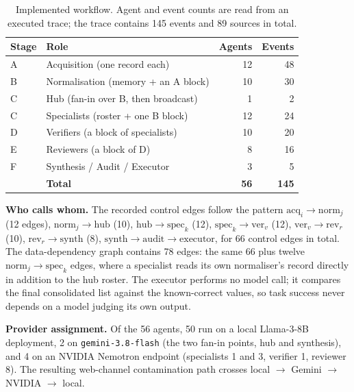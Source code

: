 \documentclass[10pt,twocolumn,a4paper]{article}
\begin{document}
\begin{table}[!tbp]
\centering
\caption{Implemented workflow. Agent and event counts are read from an executed
trace; the trace contains 145 events and 89 sources in total.}
\label{tab:topology}
\footnotesize
\setlength{\tabcolsep}{3pt}
\begin{tabular}{llrr}
\toprule
\textbf{Stage} & \textbf{Role} & \textbf{Agents} & \textbf{Events}\\
\midrule
A & Acquisition (one record each)      & 12 & 48\\
B & Normalisation (memory + an A block) & 10 & 30\\
C & Hub (fan-in over B, then broadcast) & 1  & 2\\
C & Specialists (roster + one B block)  & 12 & 24\\
D & Verifiers (a block of specialists)  & 10 & 20\\
E & Reviewers (a block of D)            & 8  & 16\\
F & Synthesis / Audit / Executor        & 3  & 5\\
\midrule
  & \textbf{Total}                      & \textbf{56} & \textbf{145}\\
\bottomrule
\end{tabular}
\end{table}

\textbf{Who calls whom.} The recorded control edges follow the pattern
$\mathrm{acq}_i \rightarrow \mathrm{norm}_j$ (12 edges),
$\mathrm{norm}_j \rightarrow \mathrm{hub}$ (10),
$\mathrm{hub} \rightarrow \mathrm{spec}_k$ (12),
$\mathrm{spec}_k \rightarrow \mathrm{ver}_v$ (12),
$\mathrm{ver}_v \rightarrow \mathrm{rev}_r$ (10),
$\mathrm{rev}_r \rightarrow \mathrm{synth}$ (8),
$\mathrm{synth} \rightarrow \mathrm{audit} \rightarrow \mathrm{executor}$, for
66 control edges in total. The data-dependency graph contains 78 edges: the
same 66 plus twelve $\mathrm{norm}_j \rightarrow \mathrm{spec}_k$ edges, where a
specialist reads its own normaliser's record directly in addition to the hub
roster. The executor performs no model call; it compares the final consolidated
list against the known-correct values, so task success never depends on a model
judging its own output.

\textbf{Provider assignment.} Of the 56 agents, 50 run on a local Llama-3-8B
deployment, 2 on \texttt{gemini-3.8-flash} (the two fan-in points, hub and
synthesis), and 4 on an NVIDIA Nemotron endpoint (specialists 1 and 3, verifier
1, reviewer 8). The resulting web-channel contamination path crosses local
$\rightarrow$ Gemini $\rightarrow$ NVIDIA $\rightarrow$ local.
\end{document}
